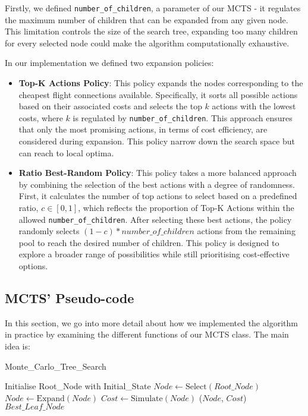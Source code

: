 Firstly, we defined \texttt{number\_of\_children}, a parameter of our MCTS - it regulates the maximum number of children that can be expanded from any given node. This limitation controls the size of the search tree, expanding too many children for every selected node could make the algorithm computationally exhaustive.

In our implementation we defined two expansion policies:

\begin{itemize}
    \item \textbf{Top-K Actions Policy}: This policy expands the nodes corresponding to the cheapest flight connections available. Specifically, it sorts all possible actions based on their associated costs and selects the top \(k\) actions with the lowest costs, where \(k\) is regulated by \texttt{number\_of\_children}. This approach ensures that only the most promising actions, in terms of cost efficiency, are considered during expansion. This policy narrow down the search space but can reach to local optima.
    \item \textbf{Ratio Best-Random Policy}: This policy takes a more balanced approach by combining the selection of the best actions with a degree of randomness. First, it calculates the number of top actions to select based on a predefined ratio, \(c \in [0,1]\), which reflects the proportion of Top-K Actions within the allowed \texttt{number\_of\_children}. After selecting these best actions, the policy randomly selects $(1-c)*number\_of\_children$ actions from the remaining pool to reach the desired number of children. This policy is designed to explore a broader range of possibilities while still prioritising cost-effective options.
\end{itemize}


\subsection{MCTS' Pseudo-code}
In this section, we go into more detail about how we implemented the algorithm in practice by examining the different functions of our MCTS class. The main idea is:

\begin{algorithm}[H]
    \caption{Monte\_Carlo\_Tree\_Search}
    \label{alg:MCTS}
    \begin{algorithmic}[1]
        \STATE Initialise Root\_Node with Initial\_State
        \STATE $Node \leftarrow \text{Select}(Root\_Node)$
        \STATE $Node \leftarrow \text{Expand}(Node)$
        \ENDIF
        \STATE $Cost \leftarrow \text{Simulate}(Node)$
        \STATE {}($Node$, $Cost$)
        \ENDWHILE
        \RETURN $Best\_Leaf\_Node$
    \end{algorithmic}
\end{algorithm}

